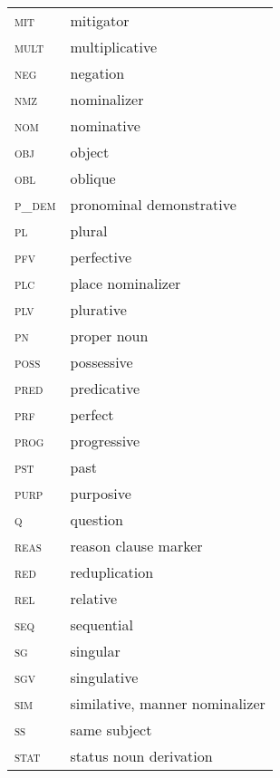 \documentclass[output=paper]{langscibook}
\begin{document}
\begin{tabularx}{.45\textwidth}{lQ}
\textsc{mit} & mitigator\\
\textsc{mult} & multiplicative\\
\textsc{neg} & negation\\
\textsc{nmz} & nominalizer\\
\textsc{nom} & nominative\\
\textsc{obj} & object\\
\textsc{obl} & oblique\\
\textsc{p\_dem} & pronominal demonstrative\\
\textsc{pl} & plural\\
\textsc{pfv} & perfective\\
\textsc{plc} & place nominalizer\\
\textsc{plv} & plurative\\
\textsc{pn} & proper noun\\
\textsc{poss} & possessive\\
\textsc{pred} & predicative\\
\textsc{prf} & perfect\\
\textsc{prog} & progressive\\
\textsc{pst} & past\\
\textsc{purp} & purposive\\
\textsc{q} & question\\
\textsc{reas} & reason clause marker\\
\textsc{red} & reduplication\\
\textsc{rel} & relative\\
\textsc{seq} & sequential\\
\textsc{sg} & singular\\
\textsc{sgv} & singulative\\
\textsc{sim} & similative, manner nominalizer\\
\textsc{ss} & same subject\\
\textsc{stat} & status noun derivation\\
\end{tabularx}

{\sloppy\printbibliography[heading=subbibliography,notkeyword=this]}
\end{document}
